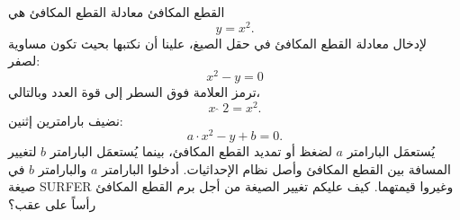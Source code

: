 \begin{surferPage}[Parabola]{القطع المكافئ}
معادلة القطع المكافئ هي  \[y=x^2.\]
لإدخال معادلة القطع المكافئ في حقل الصيغ، علينا أن نكتبها بحيث تكون مساوية لصفر:
\[x^2-y=0\]
ترمز العلامة فوق السطر إلى قوة العدد وبالتالي،
\[ x  \,\hat{\ } \, 2 =x^2.\]
نضيف بارامترين إثنين:
\[a \cdot x^2-y+b=0.\]
يُستعمَل البارامتر $a$ لضغظ أو تمديد القطع المكافئ، بينما يُستعمَل البارامتر $b$ لتغيير المسافة بين القطع المكافئ وأصل نظام الإحداثيات.
\newline
أدخلوا البارامتر $a$ والبارامتر $b$ في صيغة \textenglish{SURFER} وغيروا قيمتهما. كيف عليكم تغيير الصيغة من أجل برم القطع المكافئ رأساً على عقب؟
\end{surferPage}
